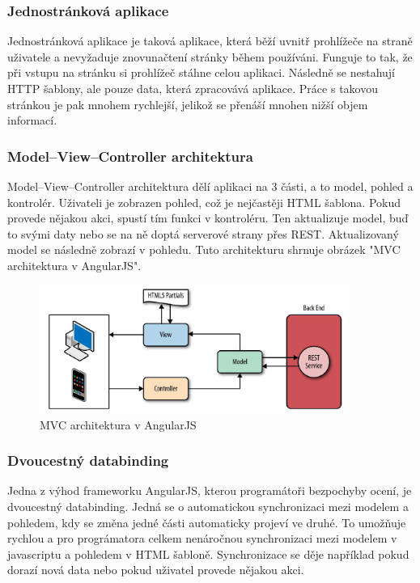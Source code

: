 \documentclass[czech,master,public,dept460,male,cpdeclaration,twoside]{diploma}
\begin{document}
\subsubsection{Jednostránková aplikace}
Jednostránková aplikace je taková aplikace, která běží uvnitř prohlížeče na straně uživatele a nevyžaduje znovunačtení stránky během používáni. Funguje to tak, že při vstupu na stránku si prohlížeč stáhne celou aplikaci. Následně se nestahují HTTP šablony, ale pouze data, která zpracovává aplikace. Práce s takovou stránkou je pak mnohem rychlejší, jelikož se přenáší mnohen nižší objem informací. \cite{SPA}

\subsubsection{Model–View–Controller architektura}
Model–View–Controller architektura dělí aplikaci na 3 části, a to model, pohled a kontrolér. Uživateli je zobrazen pohled, což je nejčastěji HTML šablona. Pokud provede nějakou akci, spustí tím funkci v kontroléru. Ten aktualizuje model, buď to svými daty nebo se na ně doptá serverové strany přes REST. Aktualizovaný model se následně zobrazí v pohledu. Tuto architekturu shrnuje obrázek "MVC architektura v AngularJS".
\begin{figure}[H]
\centering\includegraphics[width=0.9\textwidth]{Figures/MVC.png}\caption{MVC architektura v AngularJS}
\end{figure}

\subsubsection{Dvoucestný databinding}
Jedna z výhod frameworku AngularJS, kterou programátoři bezpochyby ocení, je dvoucestný databinding. Jedná se o automatickou synchronizaci mezi modelem a pohledem, kdy se změna jedné části automaticky projeví ve druhé. To umožňuje rychlou a pro prográmatora celkem nenáročnou synchronizaci mezi modelem v javascriptu a pohledem v HTML šabloně. Synchronizace se děje například pokud dorazí nová data nebo pokud uživatel provede nějakou akci. \cite{databinding}
\end{document}
